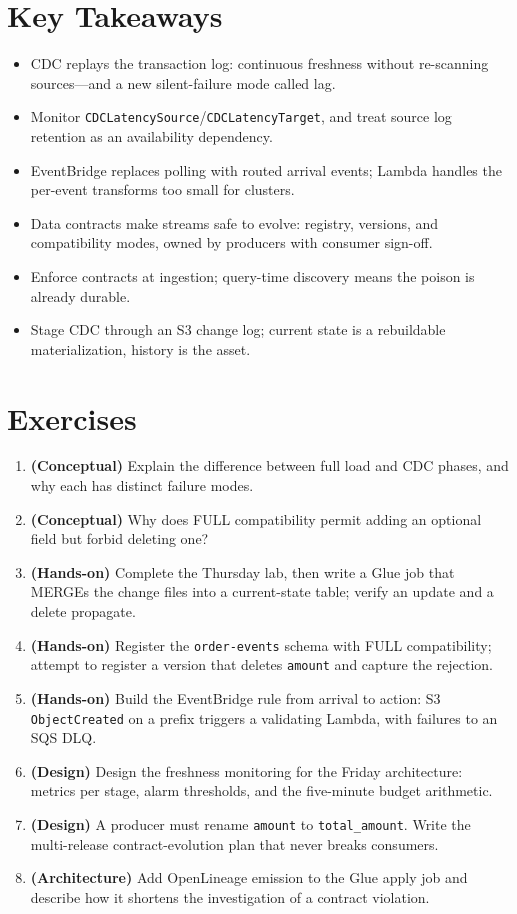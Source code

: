\section*{Key Takeaways}
\begin{itemize}
    \item CDC replays the transaction log: continuous freshness without re-scanning sources---and a new silent-failure mode called lag.
    \item Monitor \texttt{CDCLatencySource}/\texttt{CDCLatencyTarget}, and treat source log retention as an availability dependency.
    \item EventBridge replaces polling with routed arrival events; Lambda handles the per-event transforms too small for clusters.
    \item Data contracts make streams safe to evolve: registry, versions, and compatibility modes, owned by producers with consumer sign-off.
    \item Enforce contracts at ingestion; query-time discovery means the poison is already durable.
    \item Stage CDC through an S3 change log; current state is a rebuildable materialization, history is the asset.
\end{itemize}

\section{Exercises}
\begin{enumerate}
    \item \textbf{(Conceptual)} Explain the difference between full load and CDC phases, and why each has distinct failure modes.
    \item \textbf{(Conceptual)} Why does FULL compatibility permit adding an optional field but forbid deleting one?
    \item \textbf{(Hands-on)} Complete the Thursday lab, then write a Glue job that MERGEs the change files into a current-state table; verify an update and a delete propagate.
    \item \textbf{(Hands-on)} Register the \texttt{order-events} schema with FULL compatibility; attempt to register a version that deletes \texttt{amount} and capture the rejection.
    \item \textbf{(Hands-on)} Build the EventBridge rule from arrival to action: S3 \texttt{ObjectCreated} on a prefix triggers a validating Lambda, with failures to an SQS DLQ.
    \item \textbf{(Design)} Design the freshness monitoring for the Friday architecture: metrics per stage, alarm thresholds, and the five-minute budget arithmetic.
    \item \textbf{(Design)} A producer must rename \texttt{amount} to \texttt{total\_amount}. Write the multi-release contract-evolution plan that never breaks consumers.
    \item \textbf{(Architecture)} Add OpenLineage emission to the Glue apply job and describe how it shortens the investigation of a contract violation.
\end{enumerate}

